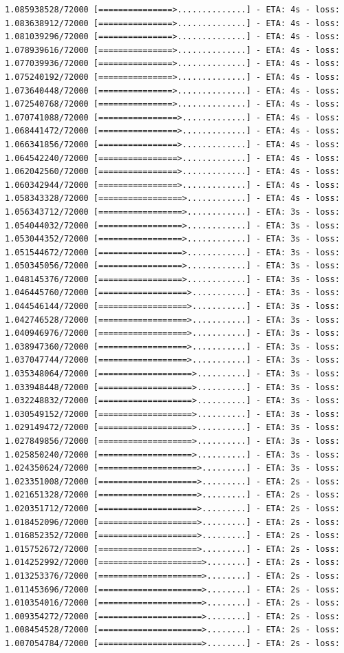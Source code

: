 \documentclass[12pt,fleqn]{article}\usepackage{../../common}
\begin{document}
\begin{verbatim}
1.085938528/72000 [===============>..............] - ETA: 4s - loss: 1.083638912/72000 [===============>..............] - ETA: 4s - loss: 1.081039296/72000 [===============>..............] - ETA: 4s - loss: 1.078939616/72000 [===============>..............] - ETA: 4s - loss: 1.077039936/72000 [===============>..............] - ETA: 4s - loss: 1.075240192/72000 [===============>..............] - ETA: 4s - loss: 1.073640448/72000 [===============>..............] - ETA: 4s - loss: 1.072540768/72000 [===============>..............] - ETA: 4s - loss: 1.070741088/72000 [================>.............] - ETA: 4s - loss: 1.068441472/72000 [================>.............] - ETA: 4s - loss: 1.066341856/72000 [================>.............] - ETA: 4s - loss: 1.064542240/72000 [================>.............] - ETA: 4s - loss: 1.062042560/72000 [================>.............] - ETA: 4s - loss: 1.060342944/72000 [================>.............] - ETA: 4s - loss: 1.058343328/72000 [=================>............] - ETA: 4s - loss: 1.056343712/72000 [=================>............] - ETA: 3s - loss: 1.054044032/72000 [=================>............] - ETA: 3s - loss: 1.053044352/72000 [=================>............] - ETA: 3s - loss: 1.051544672/72000 [=================>............] - ETA: 3s - loss: 1.050345056/72000 [=================>............] - ETA: 3s - loss: 1.048145376/72000 [=================>............] - ETA: 3s - loss: 1.046445760/72000 [==================>...........] - ETA: 3s - loss: 1.044546144/72000 [==================>...........] - ETA: 3s - loss: 1.042746528/72000 [==================>...........] - ETA: 3s - loss: 1.040946976/72000 [==================>...........] - ETA: 3s - loss: 1.038947360/72000 [==================>...........] - ETA: 3s - loss: 1.037047744/72000 [==================>...........] - ETA: 3s - loss: 1.035348064/72000 [===================>..........] - ETA: 3s - loss: 1.033948448/72000 [===================>..........] - ETA: 3s - loss: 1.032248832/72000 [===================>..........] - ETA: 3s - loss: 1.030549152/72000 [===================>..........] - ETA: 3s - loss: 1.029149472/72000 [===================>..........] - ETA: 3s - loss: 1.027849856/72000 [===================>..........] - ETA: 3s - loss: 1.025850240/72000 [===================>..........] - ETA: 3s - loss: 1.024350624/72000 [====================>.........] - ETA: 3s - loss: 1.023351008/72000 [====================>.........] - ETA: 2s - loss: 1.021651328/72000 [====================>.........] - ETA: 2s - loss: 1.020351712/72000 [====================>.........] - ETA: 2s - loss: 1.018452096/72000 [====================>.........] - ETA: 2s - loss: 1.016852352/72000 [====================>.........] - ETA: 2s - loss: 1.015752672/72000 [====================>.........] - ETA: 2s - loss: 1.014252992/72000 [=====================>........] - ETA: 2s - loss: 1.013253376/72000 [=====================>........] - ETA: 2s - loss: 1.011453696/72000 [=====================>........] - ETA: 2s - loss: 1.010354016/72000 [=====================>........] - ETA: 2s - loss: 1.009354272/72000 [=====================>........] - ETA: 2s - loss: 1.008454528/72000 [=====================>........] - ETA: 2s - loss: 1.007054784/72000 [=====================>........] - ETA: 2s - loss: 
\end{verbatim}
\end{document}
